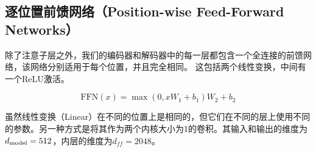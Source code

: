 \subsection{逐位置前馈网络（Position-wise Feed-Forward Networks）}\label{sec:ffn}

除了注意子层之外，我们的编码器和解码器中的每一层都包含一个全连接的前馈网络，该网络分别适用于每个位置，并且完全相同。 这包括两个线性变换，中间有一个ReLU激活。

\begin{equation}
   \mathrm{FFN}(x)=\max(0, xW_1 + b_1) W_2 + b_2
\end{equation}


虽然线性变换（Linear）在不同的位置上是相同的，但它们在不同的层上使用不同的参数。另一种方式是将其作为两个内核大小为1的卷积。其输入和输出的维度为$d_{\text{model}}=512$，内层的维度为$d_{ff}=2048$。





